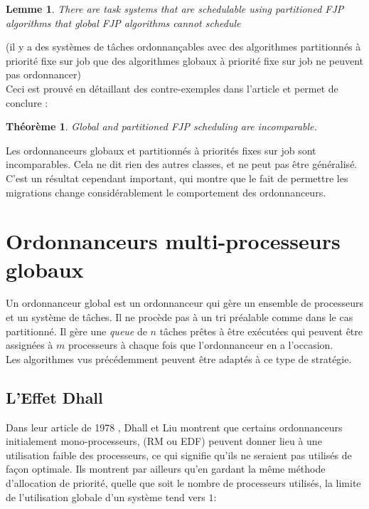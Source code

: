 \documentclass[11pt,a4paper,oneside]{report}
\newtheorem{mytheorem}{Théorème}
\newtheorem{mylemme}{Lemme}
\begin{document}
\begin{mylemme}
	There are task systems that are schedulable using partitioned FJP algorithms that global FJP algorithms cannot schedule
\end{mylemme}
(il y a des systèmes de tâches ordonnançables avec des algorithmes partitionnés à priorité fixe 
	sur job que des algorithmes globaux à priorité fixe sur job ne peuvent pas ordonnancer)\\
Ceci est prouvé en détaillant des contre-exemples dans l'article et permet de conclure :\\
\begin{mytheorem}
	Global and partitioned FJP scheduling are incomparable.
\end{mytheorem}
Les ordonnanceurs globaux et partitionnés à priorités fixes sur job sont incomparables. 
Cela ne dit rien des autres classes, et ne peut pas être généralisé. C'est 
un résultat cependant important, qui montre que le fait de permettre les migrations 
change considérablement le comportement des ordonnanceurs.

\section{Ordonnanceurs multi-processeurs globaux}
Un ordonnanceur global est un ordonnanceur qui gère un ensemble de processeurs et 
un système de tâches. Il ne procède pas à un tri préalable comme dans le cas partitionné. 
Il gère une \textit{queue} de $n$ tâches prêtes à être exécutées 
qui peuvent être assignées à $m$ processeurs à chaque fois que l'ordonnanceur en a l'occasion.\\

Les algorithmes vus précédemment peuvent être adaptés à ce type de stratégie. 

\subsection{L'Effet Dhall}
Dans leur article de 1978 \cite{dhall_real-time_1978}, Dhall et Liu montrent que certains ordonnanceurs 
initialement mono-processeurs, (RM ou EDF) peuvent donner lieu à une utilisation faible des 
processeurs, ce qui signifie qu'ils ne seraient pas utilisés de façon optimale. 
Ils montrent par ailleurs qu'en gardant la même méthode d'allocation de priorité, 
quelle que soit le nombre de processeurs utilisés, la limite de l'utilisation globale 
d'un système tend vers $1$:\\
 
\end{document}
